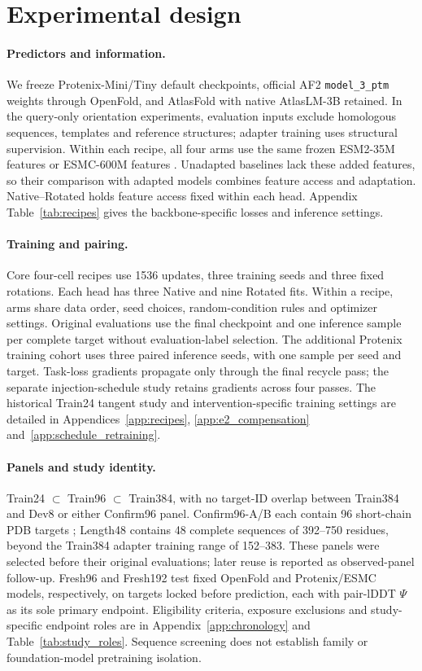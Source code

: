 \section{Experimental design}
\label{sec:design}
\paragraph{Predictors and information.}
We freeze Protenix-Mini/Tiny default checkpoints, official AF2
\texttt{model\_3\_ptm} weights through OpenFold, and AtlasFold with native
AtlasLM-3B retained. In the query-only orientation experiments, evaluation
inputs exclude homologous sequences, templates and reference structures;
adapter training uses structural supervision. Within each recipe, all four
arms use the same frozen ESM2-35M features \citep{lin2023evolutionary} or
ESMC-600M features
\citep{candido2026language}. Unadapted baselines lack these added features,
so their comparison with adapted models combines feature access and
adaptation. Native--Rotated holds feature access fixed within each head.
Appendix Table~\ref{tab:recipes} gives the backbone-specific losses and
inference settings.

\paragraph{Training and pairing.}
Core four-cell recipes use 1536 updates, three training seeds and three
fixed rotations. Each head has three Native and nine Rotated fits.
Within a recipe, arms share data order, seed choices, random-condition
rules and optimizer settings. Original evaluations use the final checkpoint
and one inference sample per complete target without evaluation-label
selection. The additional Protenix training cohort uses three paired
inference seeds, with one sample per seed and target. Task-loss gradients
propagate only through the final recycle pass;
the separate injection-schedule study retains gradients across four passes.
The historical Train24 tangent study and intervention-specific training
settings are detailed in Appendices~\ref{app:recipes},
\ref{app:e2_compensation} and~\ref{app:schedule_retraining}.

\paragraph{Panels and study identity.}
\label{sec:panels}
Train24 $\subset$ Train96 $\subset$ Train384, with no target-ID overlap
between Train384 and Dev8 or either Confirm96 panel.
Confirm96-A/B each contain 96 short-chain PDB targets
\citep{berman2000pdb}; Length48 contains 48 complete sequences of
392--750 residues, beyond the Train384 adapter training range of 152--383.
These panels were selected before their original evaluations; later reuse
is reported as observed-panel follow-up. Fresh96 and Fresh192 test fixed
OpenFold and Protenix/ESMC models, respectively, on targets locked before
prediction, each with pair-lDDT $\Psi$ as its sole primary endpoint.
Eligibility criteria, exposure exclusions and study-specific endpoint roles
are in Appendix~\ref{app:chronology} and
Table~\ref{tab:study_roles}. Sequence screening does not establish family
or foundation-model pretraining isolation.

